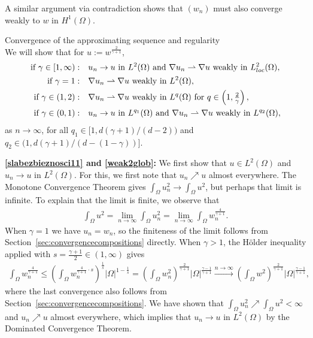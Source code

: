\documentclass[12pt,a4paper]{amsart}
\makeatletter
\theoremstyle{definition}
\renewcommand{\subsubsection}{\@startsection{subsubsection}{3}%
    \z@{.5\linespacing\@plus.7\linespacing}{-.5em}%
    {\normalfont\bfseries}}
\makeatother
\begin{document}
A similar argument via contradiction shows that $(w_n)$ must also converge weakly to $w$ in $H^1(\Omega)$.


\smallskip
\noindent

\subsubsection{Convergence of the approximating sequence and regularity}~\\
\label{sec:step6} We will show that for $u:=w^{\frac{2}{\gamma+1}}$,
\begin{align}\label{slabezbieznosci11}
    \textnormal{if}\ \gamma\in [1,\infty):&\quad u_{n}\rightarrow u  \text{ in } L^2(\Omega) \text{ and } \nabla u_{n}\rightharpoonup \nabla u \ \hbox{\rm weakly in}\ L^2_{loc}(\Omega),\\ \label{weak2glob}
    \text{if } \gamma = 1:&\quad \nabla u_{n}\rightharpoonup \nabla u \ \hbox{\rm weakly in}\ L^2(\Omega), \\ \label{weak12}
   \text{if } \gamma \in (1, 2):&\quad \nabla u_{n}\rightharpoonup \nabla u \ \hbox{\rm weakly in}\ L^q(\Omega) \text{ for } q \in \left ( 1, \tfrac{2}{\gamma} \right ), \\ 
    \label{eq:compact01}
    \textnormal{if}\ \gamma \in (0,1):&\quad u_n \to u\ \textnormal{in}\ L^{q_1}(\Omega)\ \textnormal{and}\ \nabla u_n \rightharpoonup \nabla u\ \textnormal{weakly in}\ L^{q_2}(\Omega),
\end{align}
as $n\to \infty$, for all $q_1\in [1,d(\gamma+1)/(d-2))$ and $q_2\in (1,d(\gamma+1)/(d-(1-\gamma))]$.

\textbf{\eqref{slabezbieznosci11} and \eqref{weak2glob}:}
We first show that $u\in L^2(\Omega)$ and $u_n\to u$ in $L^2(\Omega)$. For this, we first note that $u_n\nearrow u$ almost everywhere. The Monotone Convergence Theorem gives 
 $\int_\Omega u_n^2 \to \int_\Omega u^2$, but perhaps that limit is infinite. To explain that the limit is finite, we observe that
\begin{align*}
\int_\Omega u^2 = \lim\limits_{n\to\infty} \int_\Omega u_n^2  = \lim\limits_{n\to\infty} \int_\Omega w_n^{\frac{4}{\gamma+1}}. 
\end{align*}
When $\gamma =1$ we have $u_n=w_n$, so the finiteness of the limit follows from Section~\ref{sec:convergencecompositions} directly. When $\gamma >1$, the H\"older inequality applied with $s=\frac{\gamma +1}{2}\in (1,\infty)$ gives
\begin{align*}
\int_\Omega w_n^{\frac{4}{\gamma +1}} \le \left( \int_\Omega w_n^{\frac{4}{\gamma +1}\cdot s}\right)^{\frac{1}{s}}|\Omega|^{1-\frac{1}{s}} = \left( \int_\Omega w_n^2\right)^{\frac{2}{\gamma +1}}|\Omega|^{\frac{\gamma -1}{\gamma +1}}\stackrel{n\to\infty}{\rightarrow}  \left( \int_\Omega w^2\right)^{\frac{2}{\gamma +1}}|\Omega|^{\frac{\gamma -1}{\gamma +1}},
\end{align*}
where the last convergence also follows from Section~\ref{sec:convergencecompositions}. We have shown that $\int_\Omega u_n^2 \nearrow \int_\Omega u^2<\infty$ and $u_n \nearrow u$ almost everywhere, which implies that $u_n\to u$ in $L^2(\Omega)$ by the Dominated Convergence Theorem.
\end{document}
